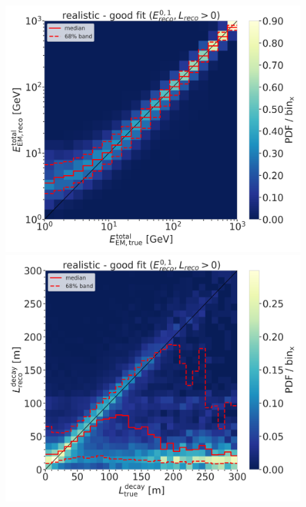 \begin{figure}[h]
	\centering
    \includegraphics[width=0.49\linewidth]{figures/model_independent_simulation/results/realistic/2d_hists/194603_reco_total_energy_vs_true_total_energy_goodfit_step_contours.png}
    \includegraphics[width=0.49\linewidth]{figures/model_independent_simulation/results/realistic/2d_hists/194603_reco_decay_length_vs_true_decay_length_goodfit_step_contours.png}
    \caption[]{}
\end{figure}

